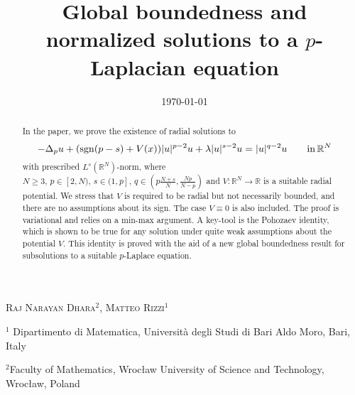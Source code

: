 \documentclass[11pt,reqno]{amsart}
\theoremstyle{definition}
\numberwithin{equation}{section}
\numberwithin{theorem}{section}
\numberwithin{equation}{section}
\numberwithin{theorem}{section}
\newcommand{\R}{\mathbb{R}}
\begin{document}
\title{Global boundedness and normalized solutions to a $p$-Laplacian equation}



\date\today
\maketitle
\centerline{\scshape Raj Narayan Dhara$^{2}$, Matteo Rizzi$^1$}


{\footnotesize
 \centerline{$^1$ Dipartimento di Matematica, Università degli Studi di Bari Aldo Moro, Bari, Italy}
\centerline{$^2$Faculty of Mathematics, Wrocław University of Science and Technology, Wroc\l{}aw, Poland}
} %
\thispagestyle{empty}


\begin{abstract}
In the paper, we prove the existence of radial solutions to
\begin{equation}\notag%
-\Delta_p u+({\rm sgn}(p-s)+V(x))|u|^{p-2}u+\lambda |u|^{s-2}u=|u|^{q-2}u\qquad\text{in}\,\R^N   \\
\end{equation}
with prescribed $L^s(\R^N)$-norm, where $N\ge 3,\,p\in[2,N),\,s\in(1,p],\,q\in(p\frac{N+s}{N},\frac{Np}{N-p})$ and $V:\R^N\to\R$ is a suitable radial potential. We stress that $V$ is required to be radial but not necessarily bounded, and there are no assumptions about its sign. The case $V\equiv 0$ is also included. The proof is variational and relies on a min-max argument. A key-tool is the Pohozaev identity, which is shown to be true for any solution under quite weak assumptions about the potential $V$. This identity is proved with the aid of a new global boundedness result for subsolutions to a suitable $p$-Laplace equation.
\end{abstract}
\end{document}
